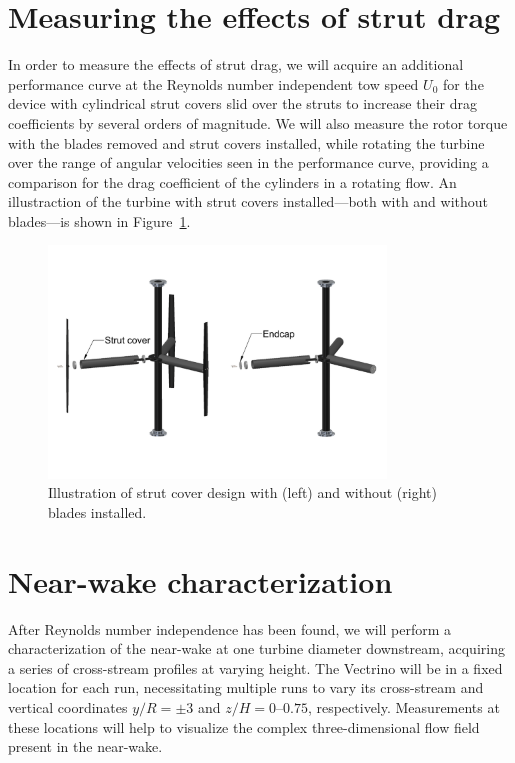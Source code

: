 \documentclass[12pt,letterpaper]{scrreprt}
\begin{document}
\section{Measuring the effects of strut drag}

In order to measure the effects of strut drag, we will acquire an additional
performance curve at the Reynolds number independent tow speed $U_0$ for the
device with cylindrical strut covers slid over the struts to increase their drag
coefficients by several orders of magnitude. We will also measure the rotor
torque with the blades removed and strut covers installed, while rotating the
turbine over the range of angular velocities seen in the performance curve,
providing a comparison for the drag coefficient of the cylinders in a rotating
flow. An illustraction of the turbine with strut covers installed---both with
and without blades---is shown in Figure~\ref{fig-strut_covers}.

\begin{figure}[!ht]
\centering
\includegraphics[width=0.8\textwidth]{Figures/strut_covers}
\caption{Illustration of strut cover design with (left) and without (right)
blades installed.}
\label{fig-strut_covers}
\end{figure}

\section{Near-wake characterization}

After Reynolds number independence has been found, we will perform a
characterization of the near-wake at one turbine diameter downstream, acquiring
a series of cross-stream profiles at varying height. The Vectrino will be in a
fixed location for each run, necessitating multiple runs to vary its
cross-stream and vertical coordinates $y/R = \pm 3$ and $z/H = 0$--$0.75$,
respectively. Measurements at these locations will help to visualize the complex
three-dimensional flow field present in the near-wake.
\end{document}
